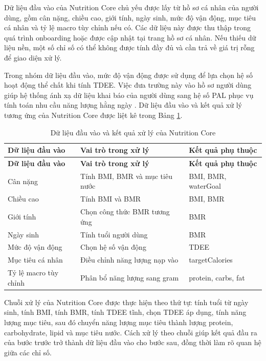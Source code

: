 \documentclass[12pt, a4paper]{report}
\begin{document}
Dữ liệu đầu vào của Nutrition Core chủ yếu được lấy từ hồ sơ cá nhân của người dùng, gồm cân nặng, chiều cao, giới tính, ngày sinh, mức độ vận động, mục tiêu cá nhân và tỷ lệ macro tùy chỉnh nếu có. Các dữ liệu này được thu thập trong quá trình onboarding hoặc được cập nhật tại trang hồ sơ cá nhân. Nếu thiếu dữ liệu nền, một số chỉ số có thể không được tính đầy đủ và cần trả về giá trị rỗng để giao diện xử lý.

Trong nhóm dữ liệu đầu vào, mức độ vận động được sử dụng để lựa chọn hệ số hoạt động thể chất khi tính TDEE. Việc đưa trường này vào hồ sơ người dùng giúp hệ thống ánh xạ dữ liệu khai báo của người dùng sang hệ số PAL phục vụ tính toán nhu cầu năng lượng hằng ngày \cite{fao_who_unu_2001}. Dữ liệu đầu vào và kết quả xử lý tương ứng của Nutrition Core được liệt kê trong Bảng \ref{tab:nutrition_core_io}.

\begin{longtable}{|>{\raggedright\arraybackslash}p{4cm}|>{\raggedright\arraybackslash}p{4cm}|p{7cm}|}
\caption{Dữ liệu đầu vào và kết quả xử lý của Nutrition Core}
\label{tab:nutrition_core_io} \\
\hline
\textbf{Dữ liệu đầu vào} & \textbf{Vai trò trong xử lý} & \textbf{Kết quả phụ thuộc} \\
\hline
\endfirsthead
\hline
\textbf{Dữ liệu đầu vào} & \textbf{Vai trò trong xử lý} & \textbf{Kết quả phụ thuộc} \\
\hline
\endhead

Cân nặng & Tính BMI, BMR và mục tiêu nước & BMI, BMR, waterGoal \\
\hline
Chiều cao & Tính BMI và BMR & BMI, BMR \\
\hline
Giới tính & Chọn công thức BMR tương ứng & BMR \\
\hline
Ngày sinh & Tính tuổi người dùng & BMR \\
\hline
Mức độ vận động & Chọn hệ số vận động & TDEE \\
\hline
Mục tiêu cá nhân & Điều chỉnh năng lượng nạp vào & targetCalories \\
\hline
Tỷ lệ macro tùy chỉnh & Phân bổ năng lượng sang gram & protein, carbs, fat \\
\hline
\end{longtable}


Chuỗi xử lý của Nutrition Core được thực hiện theo thứ tự: tính tuổi từ ngày sinh, tính BMI, tính BMR, tính TDEE tĩnh, chọn TDEE áp dụng, tính năng lượng mục tiêu, sau đó chuyển năng lượng mục tiêu thành lượng protein, carbohydrate, lipid và mục tiêu nước. Cách xử lý theo chuỗi giúp kết quả đầu ra của bước trước trở thành dữ liệu đầu vào cho bước sau, đồng thời làm rõ quan hệ giữa các chỉ số.
\end{document}
